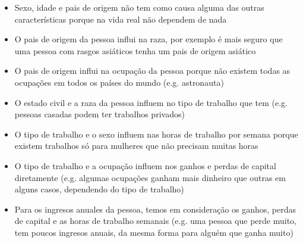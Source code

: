 	\begin{itemize}
		\item Sexo, idade e pais de origem não tem como causa alguma das outras características porque na vida real não dependem de nada
		\item O pais de origem da pessoa influi na raza, por exemplo é mais seguro que uma pessoa com rasgos asiáticos tenha um pais de origem asiático
		\item O pais de origem influi na ocupação da pessoa porque não existem todas as ocupações em todos os países do mundo (e.g. astronauta)
		\item O estado civil e a raza da pessoa influem no tipo de trabalho que tem (e.g. pessoas casadas podem ter trabalhos privados)
		\item O tipo de trabalho e o sexo influem nas horas de trabalho por semana porque existem trabalhos só para mulheres que não precisam muitas horas
		\item O tipo de trabalho e a ocupação influem nos ganhos e perdas de capital diretamente (e.g. algumas ocupações ganham mais dinheiro que outras em alguns casos, dependendo do tipo de trabalho)
		\item Para os ingresos anuales da pessoa, temos em consideração os ganhos, perdas de capital e as horas de trabalho semanais (e.g. uma pessoa que perde muito, tem poucos ingresos anuais, da mesma forma para alguém que ganha muito)
	\end{itemize}
	
